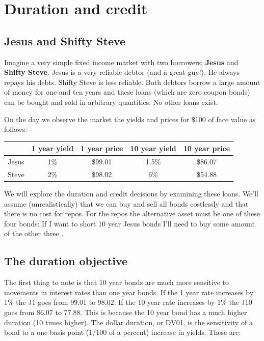 \section{Duration and credit}

\subsection{Jesus and Shifty Steve}

Imagine a very simple fixed income market with two borrowers: \textbf{Jesus} and \textbf{Shifty Steve}. Jesus is a very reliable debtor (and a great guy!). He always repays his debts. Shifty Steve is less reliable. Both debtors borrow a large amount of money for one and ten years and these loans (which are zero coupon bonds) can be bought and sold in arbitrary quantities. No other loans exist. 

On the day we observe the market  the yields and prices for \$100 of face value as follows:

\begin{center}
\begin{tabular}{|c|cc|cc|}
\hline
 & 1 year yield & 1 year price & 10 year yield & 10 year price\\
 \hline
 Jesus & 1\%  &  \$99.01 & 1.5\% & \$86.07\\
 Steve & 2\% & \$98.02 & 6\%  & \$54.88\\
 \hline
 \end{tabular}
 \end{center}

We will explore the duration and credit decisions by examining these loans. We'll assume (unrealistically) that we can buy and sell all bonds costlessly and that there is no cost for repos. For the repos the alternative asset must be one of these four bonds: If I want to short 10 year Jesus bonds I'll need to buy some amount of the other three . 

\subsection{The duration objective}

The first thing to note is that 10 year bonds are much more sensitive to movements in interest rates than one year bonds. If the 1 year rate increases by 1\% the J1 goes from 99.01 to 98.02. If the 10 year rate increases by 1\% the J10 goes from 86.07 to 77.88. This is because the 10 year bond has a much higher duration (10 times higher). The dollar duration, or DV01, is the sensitivity of a bond to a one basis point (1/100 of a percent) increase in yields. These are:



